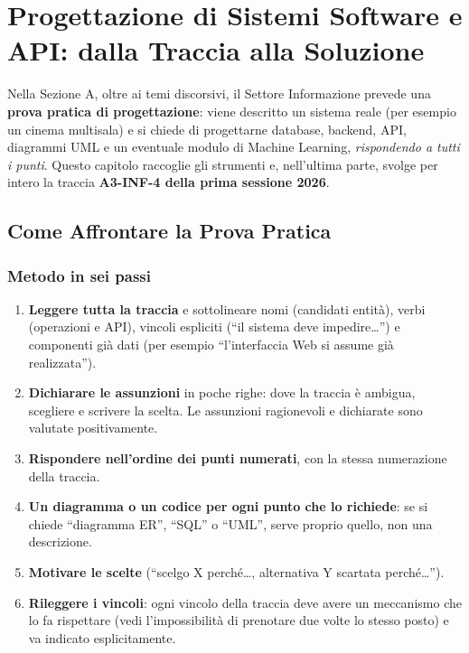 \chapter[Progettazione di Sistemi e API]{Progettazione di Sistemi Software e API: dalla Traccia alla Soluzione}

Nella Sezione A, oltre ai temi discorsivi, il Settore Informazione prevede una \textbf{prova pratica di progettazione}: viene descritto un sistema reale (per esempio un cinema multisala) e si chiede di progettarne database, backend, API, diagrammi UML e un eventuale modulo di Machine Learning, \emph{rispondendo a tutti i punti}. Questo capitolo raccoglie gli strumenti e, nell'ultima parte, svolge per intero la traccia \textbf{A3-INF-4 della prima sessione 2026}.

\section{Come Affrontare la Prova Pratica}

\subsection{Metodo in sei passi}
\begin{enumerate}
    \item \textbf{Leggere tutta la traccia} e sottolineare nomi (candidati entità), verbi (operazioni e API), vincoli espliciti (``il sistema deve impedire\ldots'') e componenti già dati (per esempio ``l'interfaccia Web si assume già realizzata'').
    \item \textbf{Dichiarare le assunzioni} in poche righe: dove la traccia è ambigua, scegliere e scrivere la scelta. Le assunzioni ragionevoli e dichiarate sono valutate positivamente.
    \item \textbf{Rispondere nell'ordine dei punti numerati}, con la stessa numerazione della traccia.
    \item \textbf{Un diagramma o un codice per ogni punto che lo richiede}: se si chiede ``diagramma ER'', ``SQL'' o ``UML'', serve proprio quello, non una descrizione.
    \item \textbf{Motivare le scelte} (``scelgo X perché\ldots, alternativa Y scartata perché\ldots'').
    \item \textbf{Rileggere i vincoli}: ogni vincolo della traccia deve avere un meccanismo che lo fa rispettare (vedi l'impossibilità di prenotare due volte lo stesso posto) e va indicato esplicitamente.
\end{enumerate}

